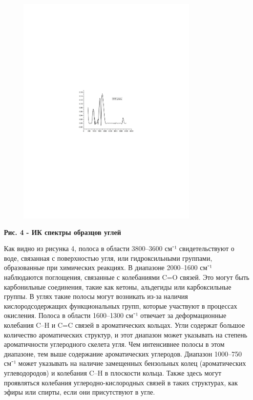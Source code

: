 \begin{figure}[H]
	\centering
	\includegraphics[width=0.8\textwidth]{media/gorn3/image12}
	\caption*{}
\end{figure}


{\bfseries Рис. 4 - ИК спектры образцов углей}

Как видно из рисунка 4, полоса в области 3800--3600 см⁻¹ свидетельствуют
о воде, связанная с поверхностью угля, или гидроксильными группами,
образованные при химических реакциях. В диапазоне 2000--1600 см⁻¹
наблюдаются поглощения, связанные с колебаниями C=O связей. Это могут
быть карбонильные соединения, такие как кетоны, альдегиды или
карбоксильные группы. В углях такие полосы могут возникать из-за наличия
кислородсодержащих функциональных групп, которые участвуют в процессах
окисления. Полоса в области 1600--1300 см⁻¹ отвечает за деформационные
колебания C--H и C=C связей в ароматических кольцах. Угли содержат
большое количество ароматических структур, и этот диапазон может
указывать на степень ароматичности углеродного скелета угля. Чем
интенсивнее полосы в этом диапазоне, тем выше содержание ароматических
углеродов. Диапазон 1000--750 см⁻¹ может указывать на наличие замещенных
бензольных колец (ароматических углеводородов) и колебания C--H в
плоскости кольца. Также здесь могут проявляться колебания
углеродно-кислородных связей в таких структурах, как эфиры или спирты,
если они присутствуют в угле.

